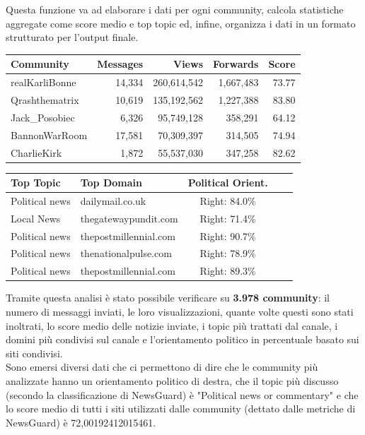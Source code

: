 \documentclass[12pt]{article}
\begin{document}
	Questa funzione va ad elaborare i dati per ogni community, calcola statistiche aggregate come score medio e top topic ed, infine, organizza i dati in un formato strutturato per l'output finale.
	\begin{table}[H]
		\centering
		\small
		\begin{tabular}{|l|r|r|r|r|}
			\hline
			\rowcolor{darkblue}
			\color{white}Community & 
			\color{white}Messages & 
			\color{white}Views & 
			\color{white}Forwards & 
			\color{white}Score \\ 
			\hline
			realKarliBonne & 
			14,334 & 
			260,614,542 & 
			1,667,483 & 
			73.77 \\ 
			\hline
			Qrashthematrix & 
			10,619 & 
			135,192,562 & 
			1,227,388 & 
			83.80 \\ 
			\hline
			Jack\_Posobiec & 
			6,326 & 
			95,749,128 & 
			358,291 & 
			64.12 \\ 
			\hline
			BannonWarRoom & 
			17,581 & 
			70,309,397 & 
			314,505 & 
			74.94 \\ 
			\hline
			CharlieKirk & 
			1,872 & 
			55,537,030 & 
			347,258 & 
			82.62 \\ 
			\hline
		\end{tabular}
		
		\vspace{0.5cm}
		
		\begin{tabular}{|l|l|c|l|c|}
			\hline
			\rowcolor{darkblue}
			\color{white}Top Topic & 
			\color{white}Top Domain & 
			\color{white}Political Orient. \\ 
			\hline
			Political news & 
			dailymail.co.uk & 
			Right: 84.0\%
			\\ 
			\hline
			Local News & 
			thegatewaypundit.com & 
			Right: 71.4\%
			\\ 
			\hline
			Political news & 
			thepostmillennial.com & 
			Right: 90.7\%
			\\ 
			\hline
			Political news & 
			thenationalpulse.com & 
			Right: 78.9\%
			\\ 
			\hline
			Political news & 
			thepostmillennial.com & 
			Right: 89.3\%
			\\ 
			\hline
		\end{tabular}
	\end{table}
	Tramite questa analisi è stato possibile verificare su \textbf{3.978 community}: il numero di messaggi inviati, le loro visualizzazioni, quante volte questi sono stati inoltrati, lo score medio delle notizie inviate, i topic più trattati dal canale, i domini più condivisi sul canale e l'orientamento politico in percentuale basato sui siti condivisi.\\
	Sono emersi diversi dati che ci permettono di dire che le community più analizzate hanno un orientamento politico di destra, che il topic più discusso (secondo la classificazione di NewsGuard) è "Political news or commentary" e che lo score medio di tutti i siti utilizzati dalle community (dettato dalle metriche di NewsGuard) è 72,00192412015461.\\
\end{document}
